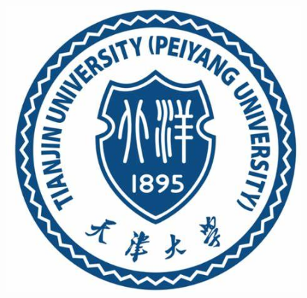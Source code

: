 \documentclass[12pt,a4paper,utf8]{article}
\title{\HUGE{\textbf{基于电影《雄狮少年》的舆情分析大数据报告}}}
\author[1]{王红阳}
\author[2]{夏睿}
\author[3]{周浩然}
\author[4]{窦浩阳}
\affil[1]{天津大学智能与计算学部-3019244233}
\affil[2]{天津大学智能与计算学部-3019244105}
\affil[3]{天津大学智能与计算学部-3019244229}
\affil[4]{天津大学智能与计算学部-3019202235}
\date{} %
\begin{document}

\begin{figure}[t]
\centering
	\includegraphics[scale=0.4]{images/图标.png} 
\end{figure}

\maketitle %
 
\begin{abstract} 
在信息发展多元化的今天，网络舆情对我国的社会生活产生了越来越深远的影响。\\

在近期，动漫电影《雄狮少年》引起了人们的激烈讨论，一方说其为辱华动漫，一方对其赞赏有加。我们选取它作为研究对象，使用各种舆情分析方式，还原公共视角。我们使用Python爬虫抓取各社交平台的约5万条用户发言,使用中文分词处理、词频统计和贝叶斯法则等方法，进行话题挖掘和情感计算，以对这一现象进行舆情分析。用词频统计和贝叶斯情感值计算来显示民众的看法和想法，然后使用TF-IDF计算、LDA话题模型，回归分析及K-means聚类方法来挖掘群众观点。结果显示，各社交平台对其看法差异较大，存在割裂现象，侧面印证了我国互联网的回声室效应。\\

 
 \textbf{[Key Words]}:  网络舆情分析、大数据、雄狮少年、社交媒体、可视化

\end{abstract}
\end{document}
